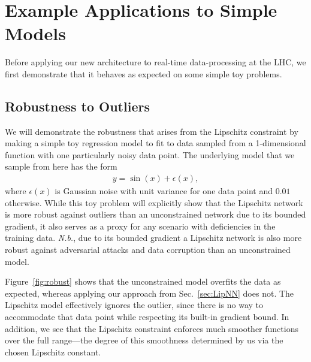 \documentclass{article}
\begin{document}
\section{Example Applications to Simple Models}

Before applying our new architecture to real-time data-processing at the LHC, we first demonstrate that it behaves as expected on some simple toy problems. 



\subsection{Robustness to Outliers}

We will demonstrate the robustness that arises from the Lipschitz constraint by making a simple toy regression model to fit to data sampled from a 1-dimensional function with one particularly noisy data point. 
The underlying model that we sample from here has the form 
\begin{align}
\label{eqn:toy2}
y = \sin(x) + \epsilon(x), 
\end{align}
where $\epsilon(x)$ is Gaussian noise with unit variance for one data point and $0.01$ otherwise.
While this toy problem will explicitly show that the Lipschitz network is more robust against outliers than an unconstrained network due to its bounded gradient, it also serves as a proxy for any scenario with deficiencies in the training data. 
{\em N.b.}, due to its bounded gradient a Lipschitz network is also more robust against adversarial attacks and data corruption than an unconstrained model.

Figure~\ref{fig:robust} shows that the unconstrained model  overfits the data as expected, whereas applying our approach from Sec.~\ref{sec:LipNN} does not. 
The Lipschitz model effectively ignores the outlier, since there is no way to accommodate that data point while respecting its built-in gradient bound. 
In addition, we see that the Lipschitz constraint enforces much smoother functions over the full range---the degree of this smoothness determined by us via the chosen Lipschitz constant.  %
\end{document}

